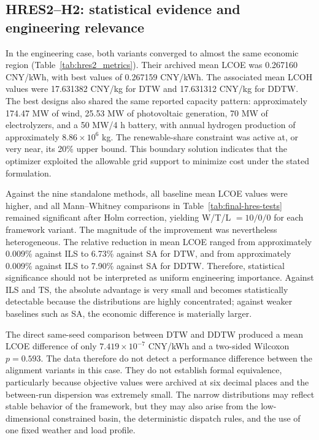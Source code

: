 \documentclass[review]{elsarticle}
\begin{document}
\subsection{HRES2--H2: statistical evidence and engineering relevance}
\label{sec:discussion-hres2}

In the engineering case, both variants converged to almost the same economic
region (Table~\ref{tab:hres2_metrics}). Their archived mean LCOE was 0.267160 CNY/kWh, with best values of
0.267159 CNY/kWh. The associated mean LCOH values were 17.631382 CNY/kg for DTW
and 17.631312 CNY/kg for DDTW. The best designs also shared the same reported
capacity pattern: approximately 174.47 MW of wind, 25.53 MW of photovoltaic
generation, 70 MW of electrolyzers, and a 50 MW/4 h battery, with annual
hydrogen production of approximately $8.86\times10^6$ kg. The renewable-share
constraint was active at, or very near, its 20\% upper bound. This boundary
solution indicates that the optimizer exploited the allowable grid support to
minimize cost under the stated formulation.

Against the nine standalone methods, all baseline mean LCOE values were higher,
and all Mann--Whitney comparisons in Table~\ref{tab:final-hres-tests} remained significant after Holm correction,
yielding W/T/L $=10/0/0$ for each framework variant. The magnitude of the
improvement was nevertheless heterogeneous. The relative reduction in mean
LCOE ranged from approximately 0.009\% against ILS to 6.73\% against SA for
DTW, and from approximately 0.009\% against ILS to 7.90\% against SA for
DDTW. Therefore, statistical significance should not be interpreted as uniform
engineering importance. Against ILS and TS, the absolute advantage is very
small and becomes statistically detectable because the distributions are
highly concentrated; against weaker baselines such as SA, the economic
difference is materially larger.

The direct same-seed comparison between DTW and DDTW produced a mean LCOE
difference of only $7.419\times10^{-7}$ CNY/kWh and a two-sided Wilcoxon
$p=0.593$. The data therefore do not detect a performance difference between
the alignment variants in this case. They do not establish formal equivalence,
particularly because objective values were archived at six decimal places and
the between-run dispersion was extremely small. The narrow distributions may
reflect stable behavior of the framework, but they may also arise from the
low-dimensional constrained basin, the deterministic dispatch rules, and the
use of one fixed weather and load profile.
\end{document}

